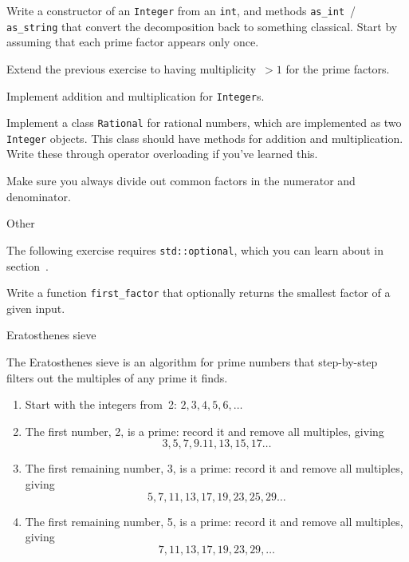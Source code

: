 \begin{exercise}
  Write a constructor of an \lstinline{Integer} from an \lstinline{int},
  and methods \lstinline{as_int}~/ \lstinline{as_string} that convert the
  decomposition back to something classical. Start by assuming that each prime factor
  appears only once.
\end{exercise}

\begin{exercise}
  Extend the previous exercise to having multiplicity~$>1$ for the prime factors.
\end{exercise}

Implement addition and multiplication for \lstinline{Integer}s.

Implement a class \lstinline{Rational} for rational numbers, which
are implemented as two \lstinline{Integer} objects.
This class should have methods for addition and multiplication.
Write these through operator overloading if you've learned this.

Make sure you always divide out common factors in the numerator and denominator.

 {Other}

The following exercise requires \lstinline+std::optional+,
which you can learn about in section~.

\begin{exercise}
  \label{ex:primeoptfact}
  Write a function \lstinline+first_factor+ that optionally
  returns the smallest factor of a given input.
\end{exercise}

 {Eratosthenes sieve}

The Eratosthenes sieve is an algorithm for prime numbers that
step-by-step filters out the multiples of any prime it finds.
\begin{enumerate}
\item Start with the integers from~2: $2,3,4,5,6,\ldots$
\item The first number, 2, is a prime: record it and remove all
  multiples, giving
  \[ 3,5,7,9.11,13,15,17\dots \]
\item The first remaining number, 3, is a prime: record it and remove
  all multiples, giving
  \[ 5,7,11,13,17,19,23,25,29\ldots \]
\item The first remaining number, 5, is a prime: record it and remove
  all multiples, giving
  \[ 7,11,13,17,19,23,29,\ldots \]
\end{enumerate}

